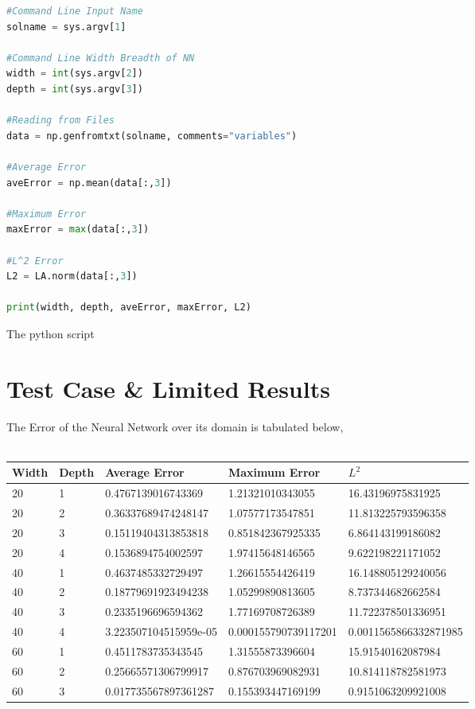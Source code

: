 \documentclass[a4paper, 12pt]{report}
\def\tabsize{4.4cm}
\def\stabsize{1.1cm}
\begin{document}
\begin{center}
\begin{lstlisting}[language=python]
#Command Line Input Name
solname = sys.argv[1]

#Command Line Width Breadth of NN
width = int(sys.argv[2])
depth = int(sys.argv[3])

#Reading from Files
data = np.genfromtxt(solname, comments="variables")

#Average Error
aveError = np.mean(data[:,3])

#Maximum Error
maxError = max(data[:,3])

#L^2 Error
L2 = LA.norm(data[:,3])

print(width, depth, aveError, maxError, L2)
\end{lstlisting}
$$$$
The python script 
\section{Test Case \& Limited Results}
\begin{comment}
\end{comment}
The Error of the Neural Network over its domain is tabulated below,
\\~\\\begin{tabular}{|m{\stabsize}|m{\stabsize}|m{\tabsize}|m{\tabsize}|m{\tabsize}|}
\hline
Width & Depth & Average Error & Maximum Error & $L^2$ \\ \hline
20& 1& 0.4767139016743369& 1.21321010343055& 16.43196975831925 \\ \hline
20& 2& 0.36337689474248147& 1.07577173547851& 11.813225793596358 \\ \hline
20& 3& 0.15119404313853818& 0.851842367925335& 6.864143199186082 \\ \hline
20& 4& 0.1536894754002597& 1.97415648146565& 9.622198221171052 \\ \hline
40& 1& 0.4637485332729497& 1.26615554426419& 16.148805129240056 \\ \hline
40& 2& 0.18779691923494238& 1.05299890813605& 8.737344682662584 \\ \hline
40& 3& 0.2335196696594362& 1.77169708726389& 11.722378501336951 \\ \hline
40& 4& 3.223507104515959e-05& 0.000155790739117201& 0.0011565866332871985 \\ \hline
60& 1& 0.4511783735343545& 1.31555873396604& 15.91540162087984 \\ \hline
60& 2& 0.25665571306799917& 0.876703969082931& 10.814118782581973 \\ \hline
60& 3& 0.017735567897361287& 0.155393447169199& 0.9151063209921008 \\ \hline

\end{tabular}
\end{center}
\end{document}
